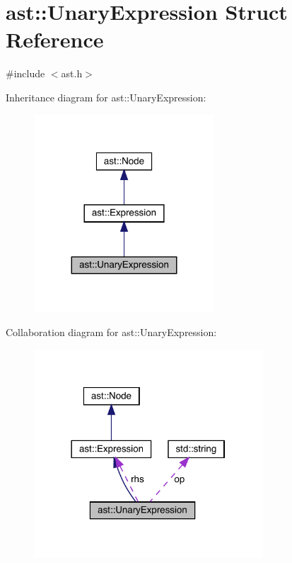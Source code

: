 \hypertarget{structast_1_1_unary_expression}{}\section{ast\+:\+:Unary\+Expression Struct Reference}
\label{structast_1_1_unary_expression}


{\ttfamily \#include $<$ast.\+h$>$}



Inheritance diagram for ast\+:\+:Unary\+Expression\+:
\nopagebreak
\begin{figure}[H]
\begin{center}
\leavevmode
\includegraphics[width=191pt]{structast_1_1_unary_expression__inherit__graph}
\end{center}
\end{figure}


Collaboration diagram for ast\+:\+:Unary\+Expression\+:
\nopagebreak
\begin{figure}[H]
\begin{center}
\leavevmode
\includegraphics[width=242pt]{structast_1_1_unary_expression__coll__graph}
\end{center}
\end{figure}
